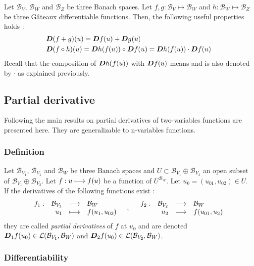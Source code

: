 Let $\mathcal{B}_V$, $\mathcal{B}_W$ and $\mathcal{B}_Z$ be three Banach spaces.
Let $f,g : \mathcal{B}_V \longmapsto \mathcal{B}_W$ and $h : \mathcal{B}_W \longmapsto \mathcal{B}_Z$ be three Gâteaux differentiable functions. Then, the following useful properties holds :
\begin{align}
	&\boldsymbol{D}(f+g)(u) = \boldsymbol{D}f(u) + \boldsymbol{D}g(u)\\
	&\boldsymbol{D}(f \circ h)(u) = \boldsymbol{D}h(f(u))\circ\boldsymbol{D}f(u) = \boldsymbol{D}h(f(u))\cdot\boldsymbol{D}f(u)
\end{align}
Recall that the composition of $\boldsymbol{D}h(f(u))$ with $\boldsymbol{D}f(u)$ means  and is also denoted by $\cdot$ as explained previously.

\subsection{Partial derivative}

Following \cite{Abraham2002} the main results on partial derivatives of two-variables functions are presented here. They are generalizable to n-variables functions.

\subsubsection{Definition}

Let $\mathcal{B}_{V_1}$, $\mathcal{B}_{V_2}$ and $\mathcal{B}_W$ be three Banach spaces and $U \subset \mathcal{B}_{V_1}\oplus\mathcal{B}_{V_2}$ an open subset of $\mathcal{B}_{V_1}\oplus\mathcal{B}_{V_2}$.
Let $f : u \longmapsto f(u)$ be a function of  $U^{\mathcal{B}_W}$.
Let $u_0 = (u_{01},u_{02}) \in U$.
If the derivatives of the following functions exist :
\begin{equation}
	\begin{array}{lrcl} f_1: & \mathcal{B}_{V_1} & \longrightarrow & \mathcal{B}_{W} \\ & u_1 & \longmapsto & f(u_1,u_{02}) \end{array}
	\quad , \quad
	\begin{array}{lrcl} f_2: & \mathcal{B}_{V_2} & \longrightarrow & \mathcal{B}_{W} \\ & u_2 & \longmapsto & f(u_{01},u_{2}) \end{array}
\end{equation}
they are called \emph{partial derivatives} of $f$ at $u_0$ and are denoted $\boldsymbol{D}_1f(u_0) \in
\mathcal{L}(\mathcal{B}_{V_1},{\mathcal{B}_W})$ and $\boldsymbol{D}_2f(u_0) \in
\mathcal{L}(\mathcal{B}_{V_2},{\mathcal{B}_W})$.

\subsubsection{Differentiability}

